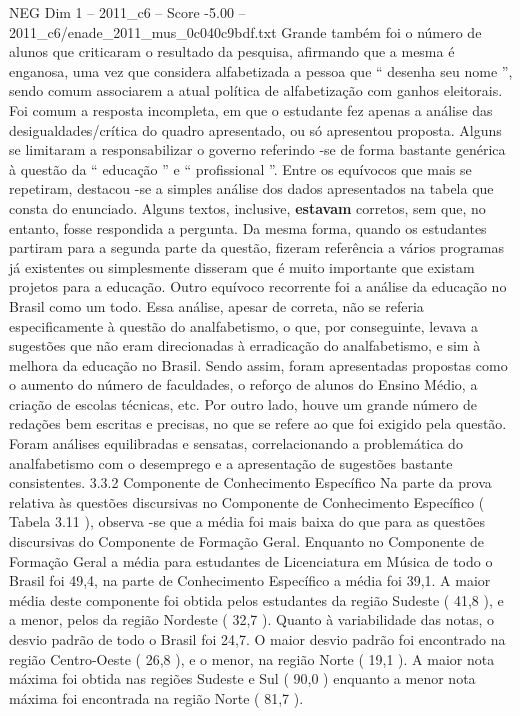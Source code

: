 \begin{textsample}{NEG Dim 1 – 2011\_c6 – Score -5.00 – 2011\_c6/enade\_2011\_mus\_0c040c9bdf.txt}
Grande também foi o número de alunos que criticaram o resultado da pesquisa, afirmando que a mesma é enganosa, uma vez que considera alfabetizada a pessoa que “ desenha seu nome ”, sendo comum associarem a atual política de alfabetização com ganhos eleitorais.
Foi comum a resposta incompleta, em que o estudante fez apenas a análise das desigualdades/crítica do quadro apresentado, ou só apresentou proposta.
Alguns se limitaram a responsabilizar o governo referindo -se de forma bastante genérica à questão da “ educação ” e “ profissional ”.
Entre os equívocos que mais se repetiram, destacou -se a simples análise dos dados apresentados na tabela que consta do enunciado.
Alguns textos, inclusive, \textbf{estavam} corretos, sem que, no entanto, fosse respondida a pergunta.
Da mesma forma, quando os estudantes partiram para a segunda parte da questão, fizeram referência a vários programas já existentes ou simplesmente disseram que é muito importante que existam projetos para a educação.
Outro equívoco recorrente foi a análise da educação no Brasil como um todo.
Essa análise, apesar de correta, não se referia especificamente à questão do analfabetismo, o que, por conseguinte, levava a sugestões que não eram direcionadas à erradicação do analfabetismo, e sim à melhora da educação no Brasil.
Sendo assim, foram apresentadas propostas como o aumento do número de faculdades, o reforço de alunos do Ensino Médio, a criação de escolas técnicas, etc.
Por outro lado, houve um grande número de redações bem escritas e precisas, no que se refere ao que foi exigido pela questão.
Foram análises equilibradas e sensatas, correlacionando a problemática do analfabetismo com o desemprego e a apresentação de sugestões bastante consistentes. 3.3.2 Componente de Conhecimento Específico Na parte da prova relativa às questões discursivas no Componente de Conhecimento Específico ( Tabela 3.11 ), observa -se que a média foi mais baixa do que para as questões discursivas do Componente de Formação Geral.
Enquanto no Componente de Formação Geral a média para estudantes de Licenciatura em Música de todo o Brasil foi 49,4, na parte de Conhecimento Específico a média foi 39,1.
A maior média deste componente foi obtida pelos estudantes da região Sudeste ( 41,8 ), e a menor, pelos da região Nordeste ( 32,7 ).
Quanto à variabilidade das notas, o desvio padrão de todo o Brasil foi 24,7.
O maior desvio padrão foi encontrado na região Centro-Oeste ( 26,8 ), e o menor, na região Norte ( 19,1 ).
A maior nota máxima foi obtida nas regiões Sudeste e Sul ( 90,0 ) enquanto a menor nota máxima foi encontrada na região Norte ( 81,7 ).

\end{textsample}
